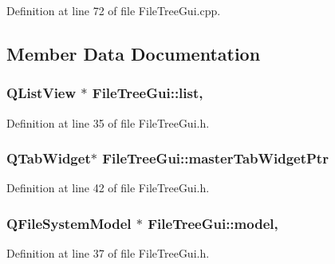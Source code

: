 Definition at line 72 of file File\-Tree\-Gui.\-cpp.



\subsection{Member Data Documentation}
\hypertarget{class_file_tree_gui_af6806c8bd5ed67e2ee8400df58605985}{
\subsubsection[{list}]{\setlength{\rightskip}{0pt plus 5cm}Q\-List\-View $\ast$ File\-Tree\-Gui\-::list\hspace{0.3cm}{\ttfamily [static]}, {\ttfamily [private]}}}\label{class_file_tree_gui_af6806c8bd5ed67e2ee8400df58605985}


Definition at line 35 of file File\-Tree\-Gui.\-h.

\hypertarget{class_file_tree_gui_adb1e3ecfaab582317fcd9b968bbf6c40}{
\subsubsection[{master\-Tab\-Widget\-Ptr}]{\setlength{\rightskip}{0pt plus 5cm}Q\-Tab\-Widget$\ast$ File\-Tree\-Gui\-::master\-Tab\-Widget\-Ptr\hspace{0.3cm}{\ttfamily [private]}}}\label{class_file_tree_gui_adb1e3ecfaab582317fcd9b968bbf6c40}


Definition at line 42 of file File\-Tree\-Gui.\-h.

\hypertarget{class_file_tree_gui_acc9d4c548eaf49500759a8b677b3e60f}{
\subsubsection[{model}]{\setlength{\rightskip}{0pt plus 5cm}Q\-File\-System\-Model $\ast$ File\-Tree\-Gui\-::model\hspace{0.3cm}{\ttfamily [static]}, {\ttfamily [private]}}}\label{class_file_tree_gui_acc9d4c548eaf49500759a8b677b3e60f}


Definition at line 37 of file File\-Tree\-Gui.\-h.

